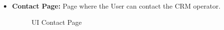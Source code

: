 \documentclass[a4paper]{article}
\begin{document}
\begin {itemize}
\begin{figure}[h!]
\centering
\vspace*{\fill}
\noindent{}%
\caption {UI Email Page}
\vspace*{0.2cm}
\end{figure}
\pagebreak
\item \textbf{Contact Page:} Page where the User can contact the CRM operator.
\begin{figure}[h!]
\centering
\vspace*{\fill}
\noindent{}%
\caption {UI Contact Page}
\vspace*{0.2cm}
\end{figure}

\end{itemize}
\end{document}
